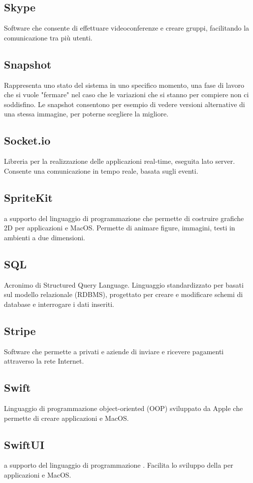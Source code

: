 \subsection*{Skype}
Software che consente di effettuare videoconferenze e creare gruppi, facilitando la comunicazione tra più utenti. 

\subsection*{Snapshot}
Rappresenta uno stato del sistema in uno specifico momento, una fase di lavoro che si vuole "fermare" nel caso che le variazioni che si stanno per compiere non ci soddisfino. Le snapshot consentono per esempio di vedere versioni alternative di una stessa immagine, per poterne scegliere la migliore.

\subsection*{Socket.io}
Libreria  per la realizzazione delle applicazioni real-time, eseguita lato server. Consente una comunicazione in tempo reale, basata sugli eventi.

\subsection*{SpriteKit}
 a supporto del linguaggio di programmazione  che permette di costruire grafiche 2D per applicazioni  e MacOS. Permette di animare figure, immagini, testi in ambienti a due dimensioni.

\subsection*{SQL}
Acronimo di Structured Query Language. Linguaggio standardizzato per  basati sul modello relazionale (RDBMS), progettato per creare e modificare schemi di database e interrogare i dati inseriti.

\subsection*{Stripe}
Software che permette a privati e aziende di inviare e ricevere pagamenti attraverso la rete Internet.

\subsection*{Swift}
Linguaggio di programmazione object-oriented (OOP) sviluppato da Apple che permette di creare applicazioni  e MacOS.  

\subsection*{SwiftUI}
 a supporto del linguaggio di programmazione . Facilita lo sviluppo della  per applicazioni  e MacOS.